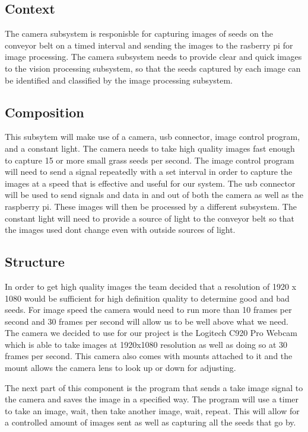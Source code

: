\subsection{Context}

The camera subsystem is responisble for capturing images of seeds on the conveyor belt on a timed interval and sending the images to the rasberry pi for image processing. The camera subsystem needs to provide clear and quick images to the vision processing subsystem, so that the seeds captured by each image can be identified and classified by the image processing subsystem. 

\subsection{Composition}
This subsytem will make use of a camera, usb connector, image control program, and a constant light. The camera needs to take high quality images fast enough to capture 15 or more small grass seeds per second. The image control program will need to send a signal repeatedly with a set interval in order to capture the images at a speed that is effective and useful for our system. The usb connector will be used to send signals and data in and out of both the camera as well as the raspberry pi. These images will then be processed by a different subsystem. The constant light will need to provide a source of light to the conveyor belt so that the images used dont change even with outside sources of light.

\subsection{Structure}
In order to get high quality images the team decided that a resolution of 1920 x 1080 would be sufficient for high definition quality to determine good and bad seeds. For image speed the camera would need to run more than 10 frames per second and 30 frames per second will allow us to be well above what we need. The camera we decided to use for our project is the Logitech C920 Pro Webcam which is able to take images at 1920x1080 resolution as well as doing so at 30 frames per second. This camera also comes with mounts attached to it and the mount allows the camera lens to look up or down for adjusting. 

The next part of this component is the program that sends a take image signal to the camera and saves the image in a specified way. The program will use a timer to take an image, wait, then take another image, wait, repeat. This will allow for a controlled amount of images sent as well as capturing all the seeds that go by. 

